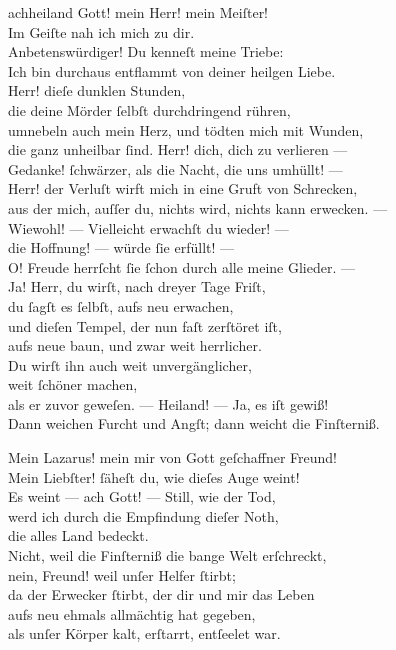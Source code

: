 \documentclass[shorttitlesize=50,tocstyle=ref-genre]{ees}
\begin{document}
{\begin{movement}{achheiland}
    \voice[Johannes]
    \hspace*{3cm}Gott! mein Herr! mein Meiſter!\\
    Im Geiſte nah ich mich zu dir.\\
    Anbetenswürdiger! Du kenneſt meine Triebe:\\
    Ich bin durchaus entflammt von deiner heilgen Liebe.\\
    Herr! dieſe dunklen Stunden,\\
    die deine Mörder ſelbſt durchdringend rühren,\\
    umnebeln auch mein Herz, und tödten mich mit Wunden,\\
    die ganz unheilbar ſind. Herr! dich, dich zu verlieren —\\
    Gedanke! ſchwärzer, als die Nacht, die uns umhüllt! —\\
    Herr! der Verluſt wirft mich in eine Gruft von Schrecken,\\
    aus der mich, auſſer du, nichts wird, nichts kann erwecken. —\\
    Wiewohl! — Vielleicht erwachſt du wieder! —\\
    die Hoffnung! — würde ſie erfüllt! —\\
    O! Freude herrſcht ſie ſchon durch alle meine Glieder. —\\
    Ja! Herr, du wirſt, nach dreyer Tage Friſt,\\
    du ſagſt es ſelbſt, aufs neu erwachen,\\
    und dieſen Tempel, der nun faſt zerſtöret iſt,\\
    aufs neue baun, und zwar weit herrlicher.\\
    Du wirſt ihn auch weit unvergänglicher,\\
    weit ſchöner machen,\\
    als er zuvor geweſen. — Heiland! — Ja, es iſt gewiß!\\
    Dann weichen Furcht und Angſt; dann weicht die Finſterniß.

    \voice[Eidli]
    Mein Lazarus! mein mir von Gott geſchaffner Freund!\\
    Mein Liebſter! ſäheſt du, wie dieſes Auge weint!\\
    Es weint — ach Gott! — Still, wie der Tod,\\
    werd ich durch die Empfindung dieſer Noth,\\
    die alles Land bedeckt.\\
    Nicht, weil die Finſterniß die bange Welt erſchreckt,\\
    nein, Freund! weil unſer Helfer ſtirbt;\\
    da der Erwecker ſtirbt, der dir und mir das Leben\\
    aufs neu ehmals allmächtig hat gegeben,\\
    als unſer Körper kalt, erſtarrt, entſeelet war.


\end{movement}}
\end{document}
